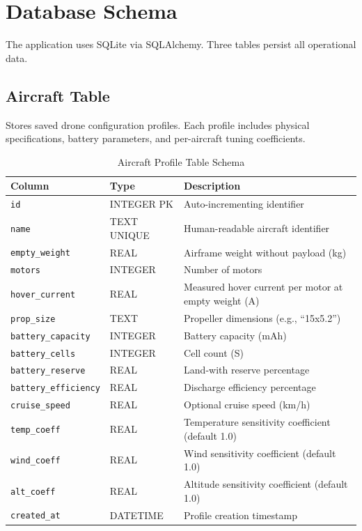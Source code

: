 \documentclass[11pt,a4paper]{article}
\begin{document}
\newpage

\section{Database Schema}

The application uses SQLite via SQLAlchemy. Three tables persist all operational data.

\subsection{Aircraft Table}
Stores saved drone configuration profiles. Each profile includes physical specifications, battery parameters, and per-aircraft tuning coefficients.

\begin{table}[H]
    \centering
    \renewcommand{\arraystretch}{1.3}
    \begin{tabularx}{\textwidth}{@{}llX@{}}
        \toprule
        \textbf{Column} & \textbf{Type} & \textbf{Description} \\
        \midrule
        \texttt{id} & INTEGER PK & Auto-incrementing identifier \\
        \texttt{name} & TEXT UNIQUE & Human-readable aircraft identifier \\
        \texttt{empty\_weight} & REAL & Airframe weight without payload (kg) \\
        \texttt{motors} & INTEGER & Number of motors \\
        \texttt{hover\_current} & REAL & Measured hover current per motor at empty weight (A) \\
        \texttt{prop\_size} & TEXT & Propeller dimensions (e.g., ``15x5.2'') \\
        \texttt{battery\_capacity} & INTEGER & Battery capacity (mAh) \\
        \texttt{battery\_cells} & INTEGER & Cell count (S) \\
        \texttt{battery\_reserve} & REAL & Land-with reserve percentage \\
        \texttt{battery\_efficiency} & REAL & Discharge efficiency percentage \\
        \texttt{cruise\_speed} & REAL & Optional cruise speed (km/h) \\
        \texttt{temp\_coeff} & REAL & Temperature sensitivity coefficient (default 1.0) \\
        \texttt{wind\_coeff} & REAL & Wind sensitivity coefficient (default 1.0) \\
        \texttt{alt\_coeff} & REAL & Altitude sensitivity coefficient (default 1.0) \\
        \texttt{created\_at} & DATETIME & Profile creation timestamp \\
        \bottomrule
    \end{tabularx}
    \caption{Aircraft Profile Table Schema}
\end{table}
\end{document}
